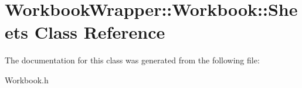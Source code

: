 \hypertarget{class_workbook_wrapper_1_1_workbook_1_1_sheets}{}\section{Workbook\+Wrapper\+:\+:Workbook\+:\+:Sheets Class Reference}
\label{class_workbook_wrapper_1_1_workbook_1_1_sheets}


The documentation for this class was generated from the following file\+:\begin{DoxyCompactItemize}
\item 
Workbook.\+h\end{DoxyCompactItemize}
